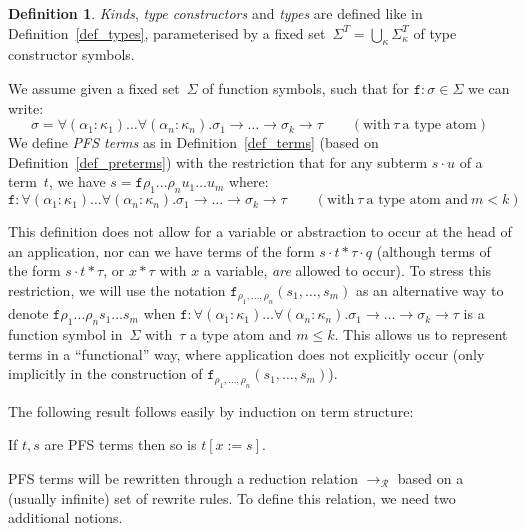 \documentclass[a4paper,UKenglish,cleveref,autoref,numberwithinsect]{lipics-v2019}
\theoremstyle{definition}
\newtheorem{defn}[theorem]{Definition}
\newcommand{\Rules}{\mathcal{R}}
\newcommand{\arrtype}{\rightarrow}
\newcommand{\app}[2]{#1 \cdot #2}
\newcommand{\subst}[2]{#1:=#2}
\newcommand{\arr}[1]{\longrightarrow_{#1}}
\begin{document}
\begin{defn}\label{def_pafs_types_terms}
  \emph{Kinds}, \emph{type constructors} and \emph{types} are defined
  like in Definition~\ref{def_types}, parameterised by a fixed
  set~$\Sigma^T = \bigcup_{\kappa}\Sigma^T_\kappa$ of type constructor
  symbols.

  We assume given a fixed set~$\Sigma$ of function symbols, such
  that for $\mathtt{f} : \sigma \in \Sigma$ we can write:
    \[
    \sigma = \forall (\alpha_1 : \kappa_1) \ldots \forall (\alpha_n : \kappa_n)
    . \sigma_1 \arrtype \ldots \arrtype \sigma_k \arrtype \tau
    \quad\quad (\text{with}\ \tau\ \text{a type atom})
    \]
  We define \emph{PFS
    terms} as in Definition~\ref{def_terms} (based on
  Definition~\ref{def_preterms}) with the restriction that
  for any subterm $\app{s}{u}$ of a term~$t$, we have $s =
    \mathtt{f} \rho_1 \ldots \rho_n u_1 \ldots u_m$ where:
    \[
    \mathtt{f} : \forall (\alpha_1 : \kappa_1) \ldots
    \forall (\alpha_n : \kappa_n) . \sigma_1 \arrtype \ldots \arrtype
    \sigma_k \arrtype \tau
    \quad\quad (\text{with}\ \tau\ \text{a type atom and}\ m < k)
    \]
\end{defn}

This definition does not allow for a variable or
abstraction to occur at the head of an application, nor can we have
terms of the form $s \cdot t * \tau \cdot q$ (although terms of the
form $s \cdot t * \tau$, or $x * \tau$ with $x$ a variable,
\emph{are} allowed to occur).  To stress this restriction, we will
use the notation
$\mathtt{f}_{\rho_1,\ldots,\rho_n}(s_1,\ldots,s_m)$ as an alternative
way to denote
$\mathtt{f} \rho_1 \ldots \rho_n s_1 \ldots s_m$ when
$
  \mathtt{f} : \forall (\alpha_1 : \kappa_1) \ldots
  \forall (\alpha_n : \kappa_n) . \sigma_1 \arrtype \ldots \arrtype
  \sigma_k \arrtype \tau
$
is a function symbol in~$\Sigma$ with~$\tau$ a type atom and $m \leq k$.
This allows us to represent terms in a ``functional'' way, where
application does not explicitly occur (only implicitly in the
construction of $\mathtt{f}_{\rho_1,\ldots,\rho_n}(s_1,\ldots,s_m)$).

The following result follows easily by induction on term
structure:

\begin{lemma}
  If $t,s$ are PFS terms then so is $t[\subst{x}{s}]$.
\end{lemma}

PFS terms will be rewritten through a reduction relation
$\arr{\Rules}$ based on a (usually infinite) set of rewrite rules. To
define this relation, we need two additional notions.
\end{document}
